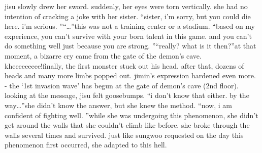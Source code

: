 jisu slowly drew her sword.
 suddenly, her eyes were torn vertically.
 she had no intention of cracking a joke with her sister.
“sister, i’m sorry, but you could die here.
 i’m serious.
”“…”this was not a training center or a stadium.
“based on my experience, you can’t survive with your born talent in this game.
 and you can’t do something well just because you are strong.
”“really? what is it then?”at that moment, a bizarre cry came from the gate of the demon’s cave.
kheeeeeeeee!finally, the first monster stuck out his head.
 after that, dozens of heads and many more limbs popped out.
 jimin’s expression hardened even more.
- the ‘1st invasion wave’ has begun at the gate of demon’s cave (2nd floor).
looking at the message, jisu felt goosebumps.
“i don’t know that either.
 by the way…”she didn’t know the answer, but she knew the method.
“now, i am confident of fighting well.
”while she was undergoing this phenomenon, she didn’t get around the walls that she couldn’t climb like before.
 she broke through the walls several times and survived.
just like sungwoo requested on the day this phenomenon first occurred, she adapted to this hell.


 